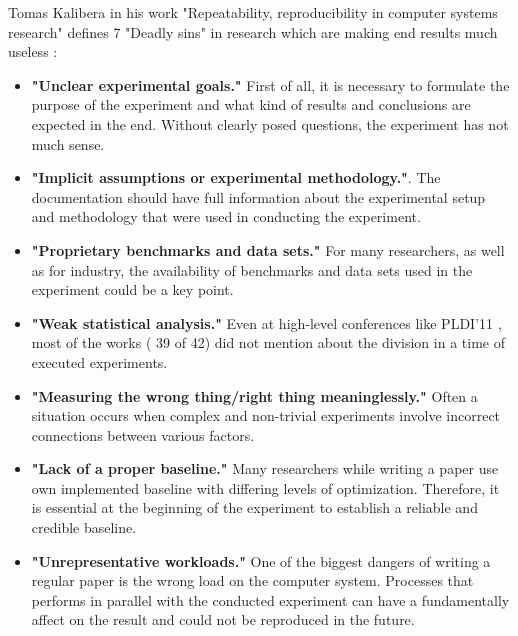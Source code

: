 \documentclass{vldb}
\begin{document}
Tomas Kalibera in his work\cite{DBLP:conf/popl/Vitek15} "Repeatability, reproducibility in computer systems research" defines 7 "Deadly sins" in research which are making end results much useless :
\begin{itemize}
    \item \textbf{"Unclear experimental goals."} First of all, it is necessary to formulate the purpose of the experiment and what kind of results and conclusions are expected in the end. Without clearly posed questions, the experiment has not much sense.
    \item \textbf{"Implicit assumptions or experimental methodology."}. The documentation should have full information about the experimental setup and methodology that were used in conducting the experiment.
    \item \textbf{"Proprietary benchmarks and data sets."} For many researchers, as well as for industry, the availability of benchmarks and data sets used in the experiment could be a key point.
    \item \textbf{"Weak statistical analysis."} Even at high-level conferences like PLDI’11 \cite{DBLP:conf/pldi/2011}, most of the works ( 39 of 42) did not mention about the division in a time of executed experiments.
    \item \textbf{"Measuring the wrong thing/right thing meaninglessly."} Often a situation occurs when complex and non-trivial experiments involve incorrect connections between various factors.
    \item \textbf{"Lack of a proper baseline."} Many researchers while writing a paper use own implemented baseline with differing levels of optimization. Therefore, it is essential at the beginning of the experiment to establish a reliable and credible baseline.
    \item \textbf{"Unrepresentative workloads."} One of the biggest dangers of writing a regular paper is the wrong load on the computer system. Processes that performs in parallel with the conducted experiment can have a fundamentally affect on the result and could not be reproduced in the future.
\end{itemize}
\end{document}
